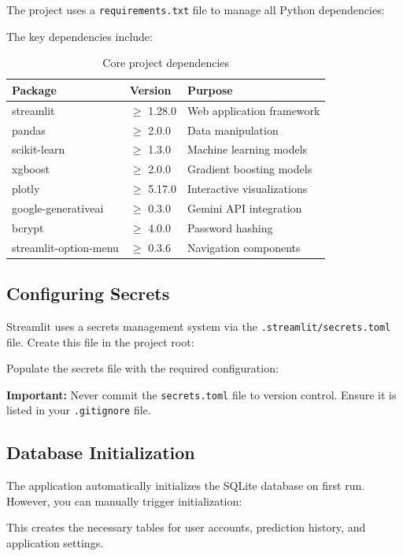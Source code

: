 The project uses a \texttt{requirements.txt} file to manage all Python dependencies:


\noindent The key dependencies include:

\begin{table}[htbp]
\centering
\caption{Core project dependencies}
\label{tab:dependencies}
\begin{tabular}{|l|l|l|}
\hline
\textbf{Package} & \textbf{Version} & \textbf{Purpose} \\
\hline
streamlit & $\geq$ 1.28.0 & Web application framework \\
\hline
pandas & $\geq$ 2.0.0 & Data manipulation \\
\hline
scikit-learn & $\geq$ 1.3.0 & Machine learning models \\
\hline
xgboost & $\geq$ 2.0.0 & Gradient boosting models \\
\hline
plotly & $\geq$ 5.17.0 & Interactive visualizations \\
\hline
google-generativeai & $\geq$ 0.3.0 & Gemini API integration \\
\hline
bcrypt & $\geq$ 4.0.0 & Password hashing \\
\hline
streamlit-option-menu & $\geq$ 0.3.6 & Navigation components \\
\hline
\end{tabular}
\end{table}

\subsection{Configuring Secrets}

Streamlit uses a secrets management system via the \texttt{.streamlit/secrets.toml} file. Create this file in the project root:


\noindent Populate the secrets file with the required configuration:


\noindent\textbf{Important:} Never commit the \texttt{secrets.toml} file to version control. Ensure it is listed in your \texttt{.gitignore} file.

\subsection{Database Initialization}

The application automatically initializes the SQLite database on first run. However, you can manually trigger initialization:


\noindent This creates the necessary tables for user accounts, prediction history, and application settings.

